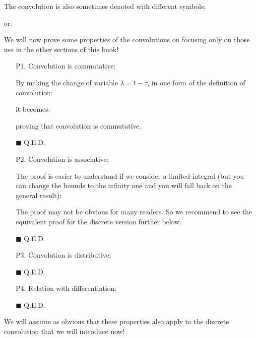 	
	\begin{tcolorbox}[title=Remark,colframe=black,arc=10pt]
	The convolution is also sometimes denoted with different symbols:
	
	or:
	
	\end{tcolorbox}
	We will now prove some properties of the convolutions on focusing only on those use in the other sections of this book!
	\begin{itemize}
		\item[P1.] Convolution is commutative:
		
		\begin{dem}
		By making the change of variable $\lambda=t-\tau$, in one form of the definition of convolution:
		
		it becomes:
		
		proving that convolution is commutative.
		\begin{flushright}
			$\blacksquare$  Q.E.D.
		\end{flushright}
		\end{dem}
		
		\item[P2.] Convolution is associative:
		
		\begin{dem}
		The proof is easier to understand if we consider a limited integral (but you can change the bounds to the infinity one and you will fall back on the general result):
		
		 The proof may not be obvious for many readers. So we recommend to see the equivalent proof for the discrete version further below.
		\begin{flushright}
			$\blacksquare$  Q.E.D.
		\end{flushright}
		\end{dem}
		
		\item[P3.] Convolution is distributive:
		
		\begin{dem}
		
		\begin{flushright}
			$\blacksquare$  Q.E.D.
		\end{flushright}
		\end{dem}
		
		\item[P4.] Relation with differentiation:
		
		\begin{dem}
		
		\begin{flushright}
			$\blacksquare$  Q.E.D.
		\end{flushright}
		\end{dem}
	\end{itemize}
	We will assume as obvious that these properties also apply to the discrete convolution that we will introduce now!
	
